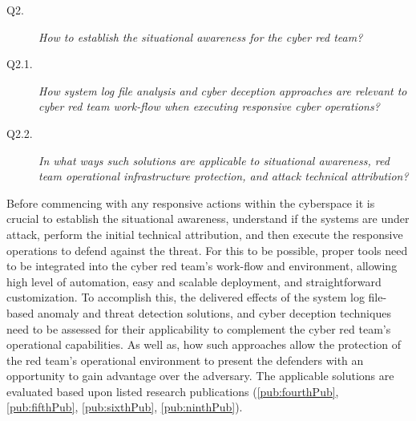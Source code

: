 \begin{description}
    \item [Q2.] \emph{How to establish the situational awareness for the cyber red team?}
    \item [Q2.1.] \emph{How system log file analysis and cyber deception approaches are relevant to cyber red team work-flow when executing responsive cyber operations?}
    \item [Q2.2.] \emph{In what ways such solutions are applicable to situational awareness, red team operational infrastructure protection, and attack technical attribution?}
\end{description}
Before commencing with any responsive actions within the cyberspace it is crucial to establish the situational awareness, understand if the systems are under attack, perform the initial technical attribution, and then execute the responsive operations to defend against the threat. For this to be possible, proper tools need to be integrated into the cyber red team's work-flow and environment, allowing high level of automation, easy and scalable deployment, and straightforward customization. To accomplish this, the delivered effects of the system log file-based anomaly and threat detection solutions, and cyber deception techniques need to be assessed for their applicability to complement the cyber red team's operational capabilities. As well as, how such approaches allow the protection of the red team's operational environment to present the defenders with an opportunity to gain advantage over the adversary.
The applicable solutions are evaluated based upon listed research publications (\ref{pub:fourthPub}, \ref{pub:fifthPub}, \ref{pub:sixthPub}, \ref{pub:ninthPub}).

